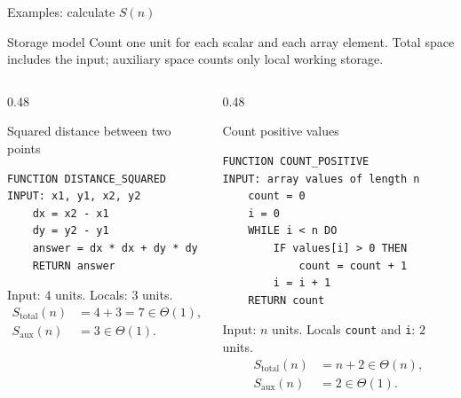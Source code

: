 \documentclass[aspectratio=169]{beamer}
\begin{document}
\begin{frame}[fragile]{Examples: calculate $S(n)$}
  \scriptsize
  \begin{block}{Storage model}
    Count one unit for each scalar and each array element. Total space includes
    the input; auxiliary space counts only local working storage.
  \end{block}
  \begin{columns}[T]
    \begin{column}{0.48\textwidth}
      \begin{exampleblock}{Squared distance between two points}
\begin{lstlisting}[style=pseudo,basicstyle=\ttfamily\tiny]
FUNCTION DISTANCE_SQUARED
INPUT: x1, y1, x2, y2
    dx = x2 - x1
    dy = y2 - y1
    answer = dx * dx + dy * dy
    RETURN answer
\end{lstlisting}
        Input: $4$ units. Locals: $3$ units.
        \[
          \begin{aligned}
            S_{\mathrm{total}}(n)&=4+3=7\in\Theta(1),\\
            S_{\mathrm{aux}}(n)&=3\in\Theta(1).
          \end{aligned}
        \]
      \end{exampleblock}
    \end{column}
    \begin{column}{0.48\textwidth}
      \begin{block}{Count positive values}
\begin{lstlisting}[style=pseudo,basicstyle=\ttfamily\tiny]
FUNCTION COUNT_POSITIVE
INPUT: array values of length n
    count = 0
    i = 0
    WHILE i < n DO
        IF values[i] > 0 THEN
            count = count + 1
        i = i + 1
    RETURN count
\end{lstlisting}
        Input: $n$ units. Locals \texttt{count} and \texttt{i}: $2$ units.
        \[
          \begin{aligned}
            S_{\mathrm{total}}(n)&=n+2\in\Theta(n),\\
            S_{\mathrm{aux}}(n)&=2\in\Theta(1).
          \end{aligned}
        \]
      \end{block}
    \end{column}
  \end{columns}
\end{frame}
\end{document}
